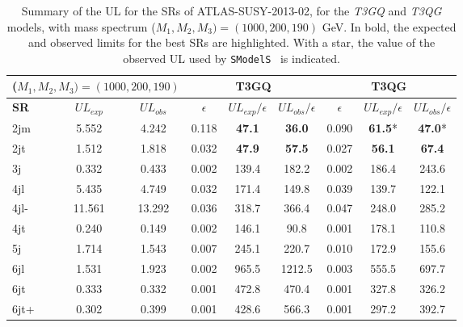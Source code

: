 \documentclass[a4paper,11pt]{article}
\newcommand{\SMO}{\texttt{SModelS\xspace}}
\begin{document}
\begin{table}[h]
	\centering
	\renewcommand\arraystretch{1.3} 
	\scriptsize
	\begin{tabular}{ l c c    c c c  |  c c c  }
		\toprule \toprule
		\multicolumn{3}{c}{($M_1,M_2,M_3) = (1000,200,190)$} & \multicolumn{3}{c}{ \textbf{T3GQ}} & \multicolumn{3}{c}{ \textbf{T3QG}} \\  \toprule 
		\textbf{SR} & $UL_{exp}$ & $UL_{obs}$ & $\epsilon$ &  $UL_{exp}/\epsilon$ & $UL_{obs}/\epsilon$ & $\epsilon$ & $UL_{exp}/ \epsilon$ & $UL_{obs}/ \epsilon$ \\
		2jm & 5.552 &  4.242 &  0.118  & \textbf{47.1} &  \textbf{36.0}  &  0.090 &  \textbf{61.5}*  & \textbf{47.0}*\\
		2jt  & 1.512  & 1.818 &  0.032  & \textbf{47.9} &  \textbf{57.5}  &  0.027 &  \textbf{56.1}  & \textbf{67.4} \\
		3j &  0.332 &  0.433  & 0.002 &  139.4 &  182.2  &  0.002 &  186.4 &  243.6 \\ 
		4jl  & 5.435 &  4.749  & 0.032  & 171.4  & 149.8  &  0.039 &  139.7  & 122.1 \\
		4jl-  & 11.561 &  13.292 &  0.036  & 318.7 &  366.4  &  0.047 &  248.0 &  285.2 \\
		4jt  & 0.240  & 0.149  & 0.002  & 146.1  & 90.8 &   0.001  & 178.1  & 110.8 \\
		5j  & 1.714  & 1.543  & 0.007 &  245.1 &  220.7  &  0.010  & 172.9  & 155.6 \\
		6jl  & 1.531  & 1.923  & 0.002  & 965.5 &  1212.5  & 0.003  & 555.5 &  697.7 \\
		6jt &  0.333  & 0.332 &  0.001  & 472.8  & 470.4 &  0.001 &  327.8  & 326.2 \\
		6jt+  & 0.302 &  0.399 &  0.001  & 428.6  & 566.3  & 0.001  & 297.2  & 392.7 \\
		\bottomrule \bottomrule
	\end{tabular}
	\caption{Summary of the UL for the SRs of ATLAS-SUSY-2013-02, for the \textit{T3GQ} and \textit{T3QG} models, with mass spectrum ($M_1,M_2,M_3) = (1000,200,190)$ GeV. In bold, the expected and observed limits for the best SRs are highlighted. With a star, the value of the observed UL used by \SMO~ is indicated.}
	\label{ATLAS02_UL}
\end{table}
\end{document}
